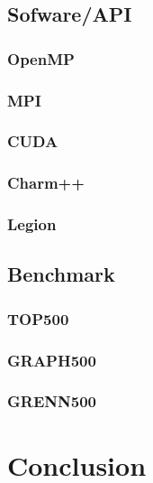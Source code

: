 \section{Sofware/API}
\subsection{OpenMP}
\subsection{MPI}
\subsection{CUDA}
\subsection{Charm++}
\subsection{Legion}
\section{Benchmark}
\subsection{TOP500}
\subsection{GRAPH500}
\subsection{GRENN500}

\chapter*{Conclusion}
